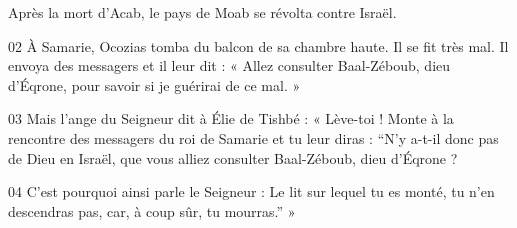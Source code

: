 Après la mort d’Acab, le pays de Moab se révolta contre Israël.

02 À Samarie, Ocozias tomba du balcon de sa chambre haute. Il se fit très mal. Il envoya des messagers et il leur dit : « Allez consulter Baal-Zéboub, dieu d’Éqrone, pour savoir si je guérirai de ce mal. »

03 Mais l’ange du Seigneur dit à Élie de Tishbé : « Lève-toi ! Monte à la rencontre des messagers du roi de Samarie et tu leur diras : “N’y a-t-il donc pas de Dieu en Israël, que vous alliez consulter Baal-Zéboub, dieu d’Éqrone ?

04 C’est pourquoi ainsi parle le Seigneur : Le lit sur lequel tu es monté, tu n’en descendras pas, car, à coup sûr, tu mourras.” » 

